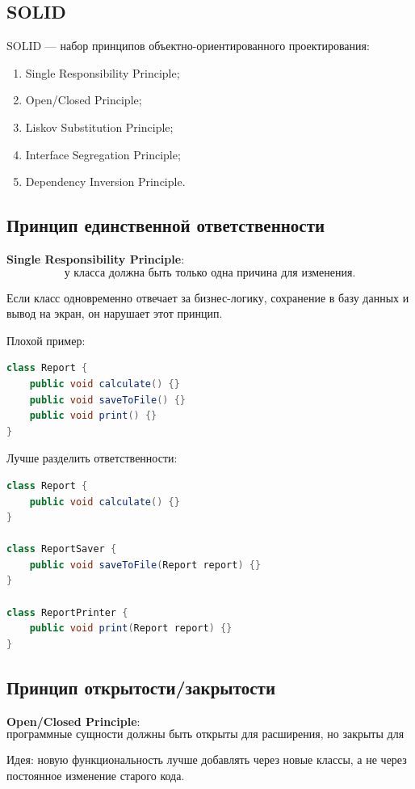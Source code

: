 \documentclass[12pt,a4paper]{article}
\begin{document}
\subsection{SOLID}

SOLID --- набор принципов объектно-ориентированного проектирования:
\begin{enumerate}
    \item Single Responsibility Principle;
    \item Open/Closed Principle;
    \item Liskov Substitution Principle;
    \item Interface Segregation Principle;
    \item Dependency Inversion Principle.
\end{enumerate}

\subsection{Принцип единственной ответственности}

\textbf{Single Responsibility Principle}:
\[
\text{у класса должна быть только одна причина для изменения.}
\]

Если класс одновременно отвечает за бизнес-логику, сохранение в базу данных и вывод на экран, он нарушает этот принцип.

Плохой пример:
\begin{lstlisting}[language=Java]
class Report {
    public void calculate() {}
    public void saveToFile() {}
    public void print() {}
}
\end{lstlisting}

Лучше разделить ответственности:
\begin{lstlisting}[language=Java]
class Report {
    public void calculate() {}
}

class ReportSaver {
    public void saveToFile(Report report) {}
}

class ReportPrinter {
    public void print(Report report) {}
}
\end{lstlisting}

\subsection{Принцип открытости/закрытости}

\textbf{Open/Closed Principle}:
\[
\text{программные сущности должны быть открыты для расширения, но закрыты для изменения.}
\]

Идея: новую функциональность лучше добавлять через новые классы, а не через постоянное изменение старого кода.
\end{document}
